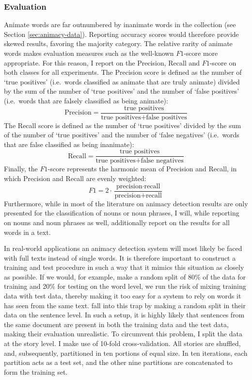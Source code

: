 \subsubsection{Evaluation}
Animate words are far outnumbered by inanimate words in the collection (see Section \ref{sec:animacy-data}). Reporting accuracy scores would therefore provide skewed results, favoring the majority category. The relative rarity of animate words makes evaluation measures such as the well-known $F1$-score more appropriate. For this reason, I report on the Precision, Recall and $F1$-score on both classes for all experiments.\autocite{rijsbergen:1979} The Precision score is defined as the number of `true positives' (i.e.\ words classified as animate that are truly animate) divided by the sum of the number of `true positives' and the number of `false positives' (i.e.\ words that are falsely classified as being animate):
\begin{equation}
\text{Precision} = \frac{\text{true positives}}{\text{true positives} + \text{false positives}}
\end{equation}
The Recall score is defined as the number of `true positives' divided by the sum of the number of `true positives' and the number of `false negatives' (i.e.\ words that are false classified as being inanimate):
\begin{equation}
\text{Recall} = \frac{\text{true positives}}{\text{true positives} + \text{false negatives}}
\end{equation}
Finally, the $F1$-score represents the harmonic mean of Precision and Recall, in which Precision and Recall are evenly weighted:
\begin{equation}
F1 = 2 \cdot \frac{\text{precision} \cdot \text{recall}}{\text{precision} + \text{recall}}
\end{equation}
Furthermore, while in most of the literature on animacy detection results are only presented for the classification of nouns or noun phrases, I will, while reporting on nouns and noun phrases as well, additionally report on the results for all words in a text.

In real-world applications an animacy detection system will most likely be faced with full texts instead of single words. It is therefore important to construct a training and test procedure in such a way that it mimics this situation as closely as possible. If we would, for example, make a random split of 80\% of the data for training and 20\% for testing on the word level, we run the risk of mixing training data with test data, thereby making it too easy for a system to rely on words it has seen from the same text. \citeauthor{bowman:2012} fall into this trap by making a random split in their data on the sentence level.\autocite{bowman:2012} In such a setup, it is highly likely that sentences from the same document are present in both the training data and the test data, making their evaluation unrealistic. To circumvent this problem, I split the data at the story level. I make use of 10-fold cross-validation. All stories are shuffled, and, subsequently, partitioned in ten portions of equal size. In ten iterations, each partition acts as a test set, and the other nine partitions are concatenated to form the training set.

